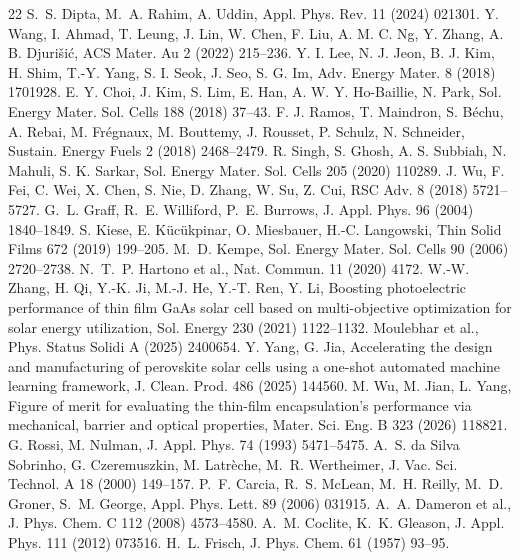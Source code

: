 \documentclass[11pt]{article}
\begin{document}
\begin{thebibliography}{22}\footnotesize
{} S.~S. Dipta, M.~A. Rahim, A. Uddin, Appl. Phys. Rev. 11 (2024) 021301.
 Y. Wang, I. Ahmad, T. Leung, J. Lin, W. Chen, F. Liu, A. M. C. Ng, Y. Zhang, A. B. Djuri\v{s}i\'c, ACS Mater. Au 2 (2022) 215--236.
 Y. I. Lee, N. J. Jeon, B. J. Kim, H. Shim, T.-Y. Yang, S. I. Seok, J. Seo, S. G. Im, Adv. Energy Mater. 8 (2018) 1701928.
 E. Y. Choi, J. Kim, S. Lim, E. Han, A. W. Y. Ho-Baillie, N. Park, Sol. Energy Mater. Sol. Cells 188 (2018) 37--43.
 F. J. Ramos, T. Maindron, S. B\'echu, A. Rebai, M. Fr\'egnaux, M. Bouttemy, J. Rousset, P. Schulz, N. Schneider, Sustain. Energy Fuels 2 (2018) 2468--2479.
 R. Singh, S. Ghosh, A. S. Subbiah, N. Mahuli, S. K. Sarkar, Sol. Energy Mater. Sol. Cells 205 (2020) 110289.
 J. Wu, F. Fei, C. Wei, X. Chen, S. Nie, D. Zhang, W. Su, Z. Cui, RSC Adv. 8 (2018) 5721--5727.
 G.~L. Graff, R.~E. Williford, P.~E. Burrows, J. Appl. Phys. 96 (2004) 1840--1849.
 S. Kiese, E. K\"uc\"ukpinar, O. Miesbauer, H.-C. Langowski, Thin Solid Films 672 (2019) 199--205.
 M.~D. Kempe, Sol. Energy Mater. Sol. Cells 90 (2006) 2720--2738.
 N.~T.~P. Hartono et al., Nat. Commun. 11 (2020) 4172.
 W.-W. Zhang, H. Qi, Y.-K. Ji, M.-J. He, Y.-T. Ren, Y. Li, Boosting photoelectric performance of thin film GaAs solar cell based on multi-objective optimization for solar energy utilization, Sol. Energy 230 (2021) 1122--1132.
 Moulebhar et al., Phys. Status Solidi A (2025) 2400654.
 Y. Yang, G. Jia, Accelerating the design and manufacturing of perovskite solar cells using a one-shot automated machine learning framework, J. Clean. Prod. 486 (2025) 144560.
 M. Wu, M. Jian, L. Yang, Figure of merit for evaluating the thin-film encapsulation's performance via mechanical, barrier and optical properties, Mater. Sci. Eng. B 323 (2026) 118821.
 G. Rossi, M. Nulman, J. Appl. Phys. 74 (1993) 5471--5475.
 A.~S. da Silva Sobrinho, G. Czeremuszkin, M. Latr\`eche, M.~R. Wertheimer, J. Vac. Sci. Technol. A 18 (2000) 149--157.
 P.~F. Carcia, R.~S. McLean, M.~H. Reilly, M.~D. Groner, S.~M. George, Appl. Phys. Lett. 89 (2006) 031915.
 A.~A. Dameron et al., J. Phys. Chem. C 112 (2008) 4573--4580.
 A.~M. Coclite, K.~K. Gleason, J. Appl. Phys. 111 (2012) 073516.
 H.~L. Frisch, J. Phys. Chem. 61 (1957) 93--95.
\end{thebibliography}
\end{document}
